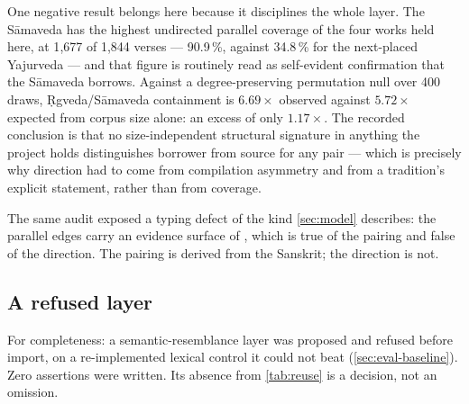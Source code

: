 One negative result belongs here because it disciplines the whole layer. The
S\=amaveda has the highest undirected parallel coverage of the four works held
here, at 1{,}677 of 1{,}844 verses --- 90.9\,\%, against 34.8\,\% for the
next-placed Yajurveda --- and that figure is routinely read as self-evident
confirmation that the S\=amaveda borrows. Against a degree-preserving permutation
null over 400 draws, \d{R}gveda/S\=amaveda containment is $6.69\times$ observed
against $5.72\times$ expected from corpus size alone: an excess of only $1.17\times$.
The recorded conclusion is that no size-independent structural signature in anything
the project holds distinguishes borrower from source for any pair --- which is
precisely why direction had to come from compilation asymmetry and from a tradition's
explicit statement, rather than from coverage.

The same audit exposed a typing defect of the kind \cref{sec:model} describes: the
parallel edges carry an evidence surface of , which is true of the
pairing and false of the direction. The pairing is derived from the Sanskrit; the
direction is not.



\subsection{A refused layer}

For completeness: a semantic-resemblance layer was proposed and refused before
import, on a re-implemented lexical control it could not beat
(\cref{sec:eval-baseline}). Zero assertions were written. Its absence from
\cref{tab:reuse} is a decision, not an omission.
